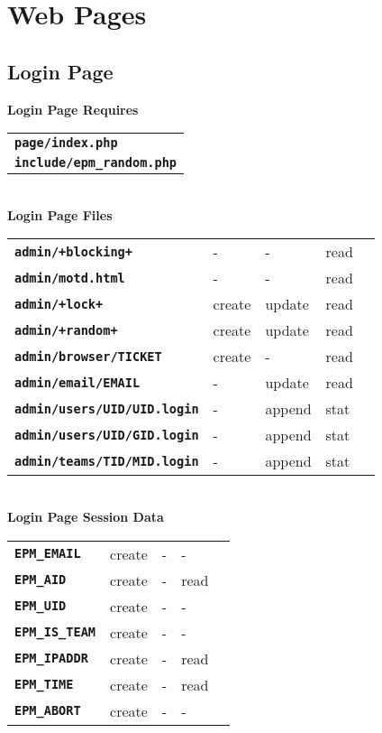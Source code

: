 \documentclass[12pt]{article}
\newcommand{\TT}[1]{{\tt \bfseries #1}}
\begin{document}
\section{Web Pages}

\subsection{Login Page}

\begin{center}
{\bf Login Page Requires}
\\[1ex]
\begin{tabular}{l}
\TT{page/index.php} \\
\TT{include/epm\_random.php} \\
\end{tabular}
\\[3ex]
{\bf Login Page Files}
\\[1ex]
\begin{tabular}{lllll}
\TT{admin/+blocking+}		& -	  & -      & read \\
\TT{admin/motd.html}		& -	  & -      & read \\
\TT{admin/+lock+}		& create  & update & read \\
\TT{admin/+random+}		& create  & update & read
\\[2ex]
\TT{admin/browser/TICKET}	& create  & -      & read \\
\TT{admin/email/EMAIL}		& -       & update & read \\
\TT{admin/users/UID/UID.login}	& -       & append & stat \\
\TT{admin/users/UID/GID.login}	& -       & append & stat \\
\TT{admin/teams/TID/MID.login}	& -       & append & stat \\
\end{tabular}
\\[3ex]
{\bf Login Page Session Data}
\\[1ex]
\begin{tabular}{lllll}
\TT{EPM\_EMAIL}	& create  & -      & - \\
\TT{EPM\_AID}	& create  & -      & read    \\
\TT{EPM\_UID}	& create  & -      & -    \\
\TT{EPM\_IS\_TEAM}
		& create  & -      & -    \\
\TT{EPM\_IPADDR}& create  & -      & read \\
\TT{EPM\_TIME}
                & create  & -      & read \\
\TT{EPM\_ABORT}
                & create  & -      & - \\
\end{tabular}
\end{center}
\end{document}
